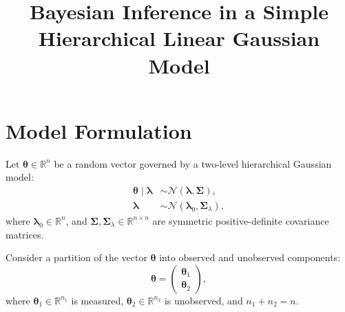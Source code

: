 \documentclass{article}
\title{Bayesian Inference in a Simple Hierarchical Linear Gaussian Model}
\author{}
\date{}
\newcommand{\R}{\mathbb{R}}
\begin{document}
\maketitle




\section*{Model Formulation}

Let $\boldsymbol{\theta} \in \mathbb{R}^n$ be a random vector governed by a two-level hierarchical Gaussian model:
\begin{align}
    \boldsymbol{\theta} \mid \boldsymbol{\lambda} &\sim \mathcal{N}(\boldsymbol{\lambda}, \boldsymbol{\Sigma}), \\
    \boldsymbol{\lambda} &\sim \mathcal{N}(\boldsymbol{\lambda}_0, \boldsymbol{\Sigma}_\lambda),
\end{align}
where $\boldsymbol{\lambda}_0 \in \mathbb{R}^n$, and $\boldsymbol{\Sigma}, \boldsymbol{\Sigma}_\lambda \in \mathbb{R}^{n \times n}$ are symmetric positive-definite covariance matrices.

Consider a partition of the vector $\boldsymbol{\theta}$ into observed and unobserved components:
\begin{equation}
    \boldsymbol{\theta} = \begin{pmatrix} \boldsymbol{\theta}_1 \\ \boldsymbol{\theta}_2 \end{pmatrix},
\end{equation}
where $\boldsymbol{\theta}_1 \in \mathbb{R}^{n_1}$ is measured, $\boldsymbol{\theta}_2 \in \mathbb{R}^{n_2}$ is unobserved, and $n_1 + n_2 = n$. 
\end{document}
